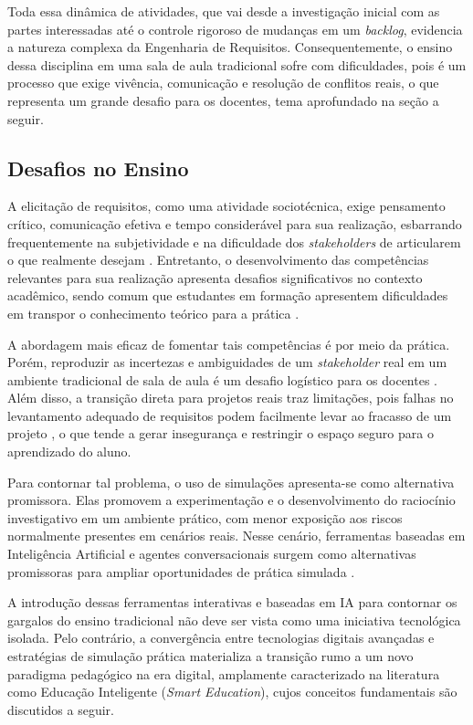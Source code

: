 Toda essa dinâmica de atividades, que vai desde a investigação inicial com as partes interessadas até o controle rigoroso de mudanças em um \textit{backlog}, evidencia a natureza complexa da Engenharia de Requisitos. Consequentemente, o ensino dessa disciplina em uma sala de aula tradicional sofre com dificuldades, pois é um processo que exige vivência, comunicação e resolução de conflitos reais, o que representa um grande desafio para os docentes, tema aprofundado na seção a seguir.

\subsection{Desafios no Ensino}

A elicitação de requisitos, como uma atividade sociotécnica, exige pensamento crítico, comunicação efetiva e tempo considerável para sua realização, esbarrando frequentemente na subjetividade e na dificuldade dos \textit{stakeholders} de articularem o que realmente desejam \cite{sommerville2016, junior2025}. Entretanto, o desenvolvimento das competências relevantes para sua realização apresenta desafios significativos no contexto acadêmico, sendo comum que estudantes em formação apresentem dificuldades em transpor o conhecimento teórico para a prática \cite{lojo2025}.

A abordagem mais eficaz de fomentar tais competências é por meio da prática. Porém, reproduzir as incertezas e ambiguidades de um \textit{stakeholder} real em um ambiente tradicional de sala de aula é um desafio logístico para os docentes \cite{lojo2025}. Além disso, a transição direta para projetos reais traz limitações, pois falhas no levantamento adequado de requisitos podem facilmente levar ao fracasso de um projeto \cite{sommerville2016}, o que tende a gerar insegurança e restringir o espaço seguro para o aprendizado do aluno.

Para contornar tal problema, o uso de simulações apresenta-se como alternativa promissora. Elas promovem a experimentação e o desenvolvimento do raciocínio investigativo em um ambiente prático, com menor exposição aos riscos normalmente presentes em cenários reais. Nesse cenário, ferramentas baseadas em Inteligência Artificial e agentes conversacionais surgem como alternativas promissoras para ampliar oportunidades de prática simulada \cite{ataei2024, schon2026, lojo2025}.

A introdução dessas ferramentas interativas e baseadas em IA para contornar os gargalos do ensino tradicional não deve ser vista como uma iniciativa tecnológica isolada. Pelo contrário, a convergência entre tecnologias digitais avançadas e estratégias de simulação prática materializa a transição rumo a um novo paradigma pedagógico na era digital, amplamente caracterizado na literatura como Educação Inteligente (\textit{Smart Education}), cujos conceitos fundamentais são discutidos a seguir.

